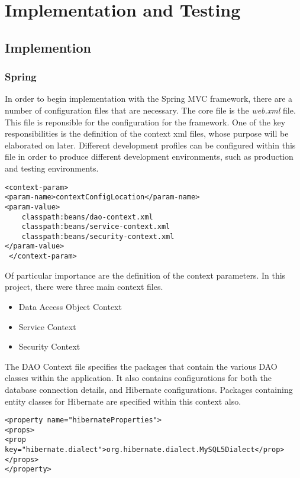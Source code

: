 \chapter{Implementation and Testing}
\label{impltesting}

\section{Implemention}
\subsection{Spring}
In order to begin implementation with the Spring MVC framework, there are a number of configuration files that are necessary. The core file is the \textit{web.xml} file. This file is reponsible for the configuration for the framework. One of the key responsibilities is the definition of the context xml files, whose purpose will be elaborated on later. Different development profiles can be configured within this file in order to produce different development environments, such as production and testing environments.\newline 

\begin{lstlisting}
<context-param>
<param-name>contextConfigLocation</param-name>
<param-value>
	classpath:beans/dao-context.xml
	classpath:beans/service-context.xml
	classpath:beans/security-context.xml
</param-value>
 </context-param>
\end{lstlisting}

Of particular importance are the definition of the context parameters. In this project, there were three main context files.

\begin{itemize}
\item Data Access Object Context
\item Service Context
\item Security Context
\end{itemize}

The DAO Context file specifies the packages that contain the various DAO classes within the application. It also contains configurations for both the database connection details, and Hibernate configurations. Packages containing entity classes for Hibernate are specified within this context also. \newline

\begin{lstlisting}
<property name="hibernateProperties">
<props>
<prop key="hibernate.dialect">org.hibernate.dialect.MySQL5Dialect</prop>
</props>
</property>
\end{lstlisting}


